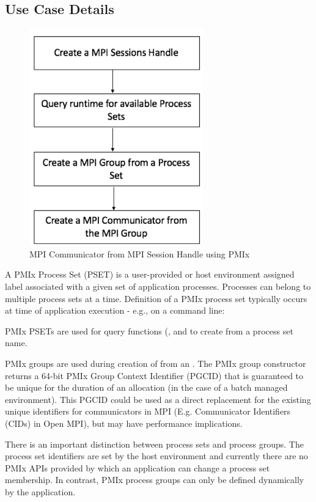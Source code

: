 \subsection{Use Case Details}

\begingroup
\begin{figure}
  \begin{center}
    \includegraphics[width=.5\textwidth,keepaspectratio]{figs/mpi-sessions1}
  \end{center}
  \caption{MPI Communicator from MPI Session Handle using PMIx}
  \label{fig:mpi_s1}
\end{figure}
\endgroup

A PMIx Process Set (PSET) is a user-provided or host environment assigned
label associated with a given set of application processes. Processes can
belong to multiple process sets at a time. Definition of a PMIx
process set typically occurs at time of application execution - e.g., on a
command line: 

PMIx PSETs are used for query functions (,  and to create  from a process set name.

PMIx groups are used during creation of  from an . The PMIx group constructor returns a 64-bit PMIx Group Context Identifier (PGCID) that is guaranteed to be unique for the duration of an allocation (in the case of a batch managed environment). This PGCID could be used as a direct replacement for the existing unique identifiers for communicators in MPI (E.g. Communicator Identifiers (CIDs) in Open MPI), but may have performance implications.

There is an important distinction between process sets and process groups. The process set identifiers are set by the host environment and currently there are no PMIx APIs provided by which an application can change a process set membership. In contrast, PMIx process groups can only be defined dynamically by the application.

